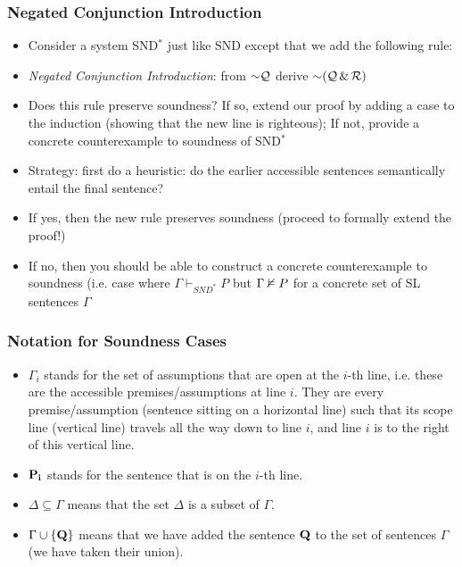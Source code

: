 \begin{frame}
\frametitle{Negated Conjunction Introduction}

\begin{itemize}[<+->]

\item Consider a system SND$^*$ just like SND except that we add the following rule:

\item \emph{Negated Conjunction Introduction}: from $\enot \metav{Q}$ derive $\enot (\metav{Q} \eand \metav{R})$

\item Does this rule preserve soundness? If so, extend our proof by adding a case to the induction (showing that the new line is righteous); If not, provide a concrete counterexample to soundness of SND$^*$

\item Strategy: first do a heuristic: do the earlier accessible sentences semantically entail the final sentence? 
\bi

\item If yes, then the new rule preserves soundness (proceed to formally extend the proof!)

\item If no, then you should be able to construct a concrete counterexample to soundness (i.e. case where $\Gamma \vdash_{SND^*} P$ but $\Gamma \nvDash P$ for a concrete set of SL sentences $\Gamma$ 

\ei


\end{itemize}
\end{frame}

\begin{frame}
\frametitle{Notation for Soundness Cases}

\begin{itemize}

\item $\Gamma_i$ stands for the set of assumptions that are open at the $i$-th line, i.e. these are the accessible premises/assumptions at line $i$. They are every premise/assumption (sentence sitting on a horizontal line) such that its scope line (vertical line) travels all the way down to line $i$, and line $i$ is to the right of this vertical line.  

\item $\mathbf{P_i}$ stands for the sentence that is on the $i $-th line.

\item $\Delta \subseteq \Gamma$ means that the set $\Delta$ is a subset of $\Gamma $.

\item $\Gamma\cup\{\mathbf{Q}\}$ means that we have added the sentence $\mathbf{Q}$ to the set of sentences $\Gamma $ (we have taken their union).

\end{itemize} 

\end{frame}

